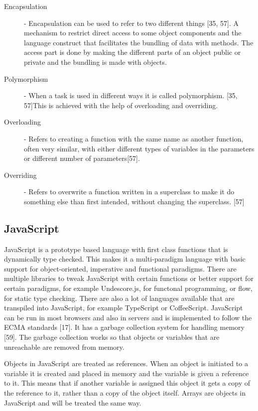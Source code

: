 \documentclass {article}
\begin{document}
\begin{description}
\item [Encapsulation] - Encapsulation can be used to refer to two different things [35, 57]. A mechanism to restrict direct access to some object components and the language construct that facilitates the bundling of data with methods. The access part is done by making the different parts of an object public or private and the bundling is made with objects.

\item [Polymorphism] - When a task is used in different ways it is called polymorphism. [35, 57]This is achieved with the help of overloading and overriding.

\item[Overloading] - Refers to creating a function with the same name as another function, often very similar, with either different types of variables in the parameters or different number of parameters[57].

\item[Overriding] - Refers to overwrite a function written in a superclass to make it do something else than first intended, without changing the superclass. [57]
\end{description}
\subsection{JavaScript}
JavaScript is a prototype based language with first class functions that is dynamically type checked. This makes it a multi-paradigm language with basic support for object-oriented, imperative and functional paradigms. There are multiple libraries to tweak JavaScript with certain functions or better support for certain paradigms, for example Undescore.js, for functonal programming, or flow, for static type checking. There are also a lot of languages available that are transpiled into JavaScript, for example TypeScript or CoffeeScript. 
JavaScript can be run in most browsers and also in servers and is implemented to follow the ECMA standards [17]. It has a garbage collection system for handling memory [59]. The garbage collection works so that objects or variables that are unreachable are removed from memory. 

Objects in JavaScript are treated as references. When an object is initiated to a variable it is created and placed in memory and the variable is given a reference to it. This means that if another variable is assigned this object it gets a copy of the reference to it, rather than a copy of the object itself. Arrays are objects in JavaScript and will be treated the same way.
\end{document}
